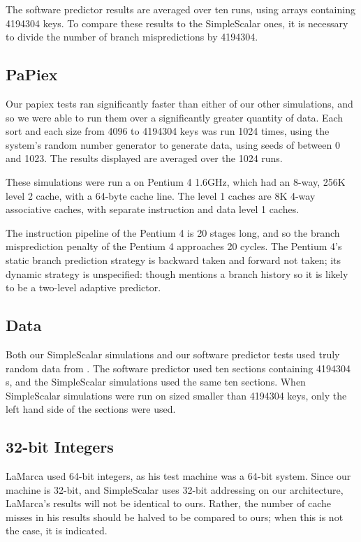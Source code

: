 The software predictor results are averaged over ten runs, using arrays
containing 4194304 keys. To compare these results to the SimpleScalar ones, it
is necessary to divide the number of branch mispredictions by 4194304.

\subsection{PaPiex}
Our papiex tests ran significantly faster than either of our other simulations,
and so we were able to run them over a significantly greater quantity of data.
Each sort and each size from 4096 to 4194304 keys was run 1024 times, using the
system's random number generator to generate data, using seeds of between 0 and
1023. The results displayed are averaged over the 1024 runs.

These simulations were run a on Pentium 4 1.6GHz, which had an 8-way, 256K level
2 cache, with a 64-byte cache line. The level 1 caches are 8K 4-way associative
caches, with separate instruction and data level 1 caches.

The instruction pipeline of the Pentium 4 is 20 stages long, and so the branch
misprediction penalty of the Pentium 4 approaches 20 cycles. The Pentium 4's
static branch prediction strategy is backward taken and forward not taken; its
dynamic strategy is unspecified: though \cite{Intel248966-010} mentions a branch
history so it is likely to be a two-level adaptive predictor.

\subsection{Data}

Both our SimpleScalar simulations and our software predictor tests used truly
random data from . The software predictor used ten
sections containing 4194304 s, and the SimpleScalar
simulations used the same ten sections. When SimpleScalar simulations were run
on sized smaller than 4194304 keys, only the left hand side of the sections were
used.

\subsection{32-bit Integers}
LaMarca used 64-bit integers, as his test machine was a 64-bit system.
Since our machine is 32-bit, and SimpleScalar uses 32-bit addressing on our
architecture, LaMarca's results will not be identical to ours. Rather, the
number of cache misses in his results should be halved to be compared to ours;
when this is not the case, it is indicated.

